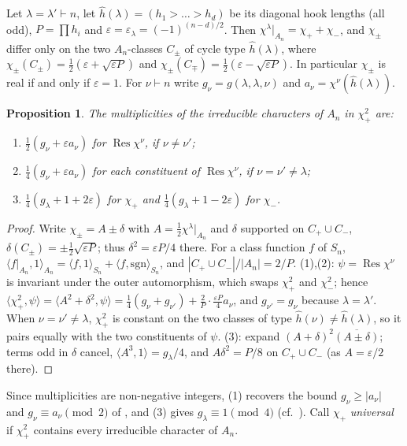 \documentclass[11pt]{amsart}
\newtheorem{proposition}[theorem]{Proposition}
\theoremstyle{remark}
\newcommand{\Res}{\operatorname{Res}}
\begin{document}
Let $\lambda=\lambda'\vdash n$, let $\hat h(\lambda)=(h_1>\dots>h_d)$ be its diagonal hook
lengths (all odd), $P=\prod h_i$ and $\varepsilon=\varepsilon_\lambda=(-1)^{(n-d)/2}$. Then
$\chi^\lambda|_{A_n}=\chi_+ +\chi_-$, and $\chi_\pm$ differ only on the two $A_n$-classes
$C_\pm$ of cycle type $\hat h(\lambda)$, where
$\chi_\pm(C_\pm)=\tfrac12(\varepsilon+\sqrt{\varepsilon P})$ and
$\chi_\pm(C_\mp)=\tfrac12(\varepsilon-\sqrt{\varepsilon P})$. In particular $\chi_\pm$ is
real if and only if $\varepsilon=1$. For $\nu\vdash n$ write
$g_\nu=g(\lambda,\lambda,\nu)$ and $a_\nu=\chi^\nu(\hat h(\lambda))$.

\begin{proposition}\label{prop:square}
The multiplicities of the irreducible characters of $A_n$ in $\chi_+^2$ are:
\begin{enumerate}
\item $\tfrac12(g_\nu+\varepsilon a_\nu)$ for $\Res\chi^\nu$, if $\nu\neq\nu'$;
\item $\tfrac14(g_\nu+\varepsilon a_\nu)$ for each constituent of $\Res\chi^\nu$, if
$\nu=\nu'\neq\lambda$;
\item $\tfrac14(g_\lambda+1+2\varepsilon)$ for $\chi_+$ and
$\tfrac14(g_\lambda+1-2\varepsilon)$ for $\chi_-$.
\end{enumerate}
\end{proposition}

\begin{proof}
Write $\chi_\pm=A\pm\delta$ with $A=\tfrac12\chi^\lambda|_{A_n}$ and $\delta$ supported on
$C_+\cup C_-$, $\delta(C_\pm)=\pm\tfrac12\sqrt{\varepsilon P}$; thus $\delta^2=\varepsilon P/4$
there. For a class function $f$ of $S_n$, $\langle f|_{A_n},1\rangle_{A_n}=\langle
f,1\rangle_{S_n}+\langle f,\mathrm{sgn}\rangle_{S_n}$, and $|C_+\cup C_-|/|A_n|=2/P$.
(1),(2): $\psi=\Res\chi^\nu$ is invariant under the outer automorphism, which swaps
$\chi_+^2$ and $\chi_-^2$; hence $\langle\chi_+^2,\psi\rangle=\langle A^2+\delta^2,\psi\rangle
=\tfrac14(g_\nu+g_{\nu'})+\tfrac2P\cdot\tfrac{\varepsilon P}4 a_\nu$, and
$g_{\nu'}=g_\nu$ because $\lambda=\lambda'$. When $\nu=\nu'\ne\lambda$, $\chi_+^2$ is constant
on the two classes of type $\hat h(\nu)\ne\hat h(\lambda)$, so it pairs equally with the two
constituents of $\psi$. (3): expand $(A+\delta)^2\overline{(A\pm\delta)}$; terms odd in
$\delta$ cancel, $\langle A^3,1\rangle=g_\lambda/4$, and $A\delta^2=P/8$ on $C_+\cup C_-$
(as $A=\varepsilon/2$ there).
\end{proof}

Since multiplicities are non-negative integers, (1) recovers the bound
$g_\nu\ge|a_\nu|$ and $g_\nu\equiv a_\nu\pmod 2$ of \cite{PPV}, and (3) gives
$g_\lambda\equiv1\pmod4$ (cf.~\cite{BB}). Call $\chi_+$ \emph{universal} if $\chi_+^2$
contains every irreducible character of $A_n$.
\end{document}
